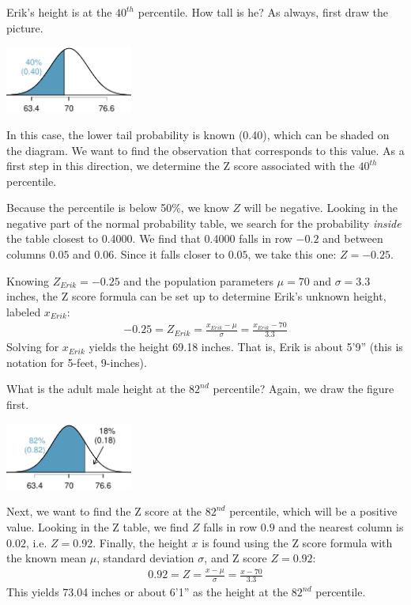 \begin{example}{Erik's height is at the $40^{th}$ percentile. How tall is he?}\label{normalExam40Perc}
As always, first draw the picture.\vspace{-1mm}
\begin{center}
\includegraphics[height=22mm]{03/figures/height40Perc/height40Perc}\vspace{-1mm}
\end{center}
In this case, the lower tail probability is known (0.40), which can be shaded on the diagram. We want to find the observation that corresponds to this value. As a first step in this direction, we determine the Z score associated with the $40^{th}$ percentile.

Because the percentile is below 50\%, we know $Z$ will be negative. Looking in the negative part of the normal probability table, we search for the probability \emph{inside} the table closest to 0.4000. We find that 0.4000 falls in row $-0.2$ and between columns $0.05$ and $0.06$. Since it falls closer to $0.05$, we take this one: $Z=-0.25$.

Knowing $Z_{Erik}=-0.25$ and the population parameters $\mu=70$ and $\sigma=3.3$ inches, the Z score formula can be set up to determine Erik's unknown height, labeled $x_{Erik}$:
\begin{eqnarray*}
-0.25 = Z_{Erik} = \frac{x_{Erik} - \mu}{\sigma} = \frac{x_{Erik} - 70}{3.3}
\end{eqnarray*}
Solving for $x_{Erik}$ yields the height 69.18 inches. That is, Erik is about 5'9'' (this is notation for 5-feet, 9-inches).
\end{example}

\begin{example}{What is the adult male height at the $82^{nd}$ percentile?}
Again, we draw the figure first.\vspace{-1mm}
\begin{center}
\includegraphics[height=22mm]{03/figures/height82Perc/height82Perc}\vspace{-1mm}
\end{center}
Next, we want to find the Z score at the $82^{nd}$ percentile, which will be a positive value. Looking in the Z table, we find $Z$ falls in row $0.9$ and the nearest column is $0.02$, i.e. $Z=0.92$. Finally, the height $x$ is found using the Z score formula with the known mean $\mu$, standard deviation $\sigma$, and Z score $Z=0.92$:
\begin{eqnarray*}
0.92 = Z = \frac{x-\mu}{\sigma} = \frac{x - 70}{3.3}
\end{eqnarray*}
This yields 73.04 inches or about 6'1'' as the height at the $82^{nd}$ percentile.
\end{example}

